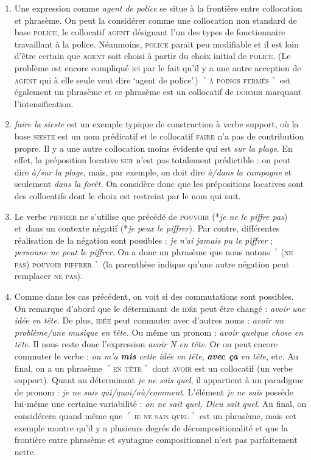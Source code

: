 {    
    \begin{enumerate}
    \item  Une expression comme \textit{agent de police} se situe à la frontière entre collocation et phrasème. On peut la considérer comme une collocation non standard de base \textsc{police}, le collocatif \textsc{agent} désignant l'un des types de fonctionnaire travaillant à la police. Néanmoins, \textsc{police} parait peu modifiable et il est loin d'être certain que \textsc{agent} soit choisi à partir du choix initial de \textsc{police}. (Le problème est encore compliqué ici par le fait qu’il y a une autre acception de \textsc{agent} qui à elle seule veut dire ‘agent de police’.) \textrm{$⌜$}\textsc{à} \textsc{poings} \textsc{fermés}\textrm{$⌝$} est également un phrasème et ce phrasème est un collocatif de \textsc{dormir} marquant l’intensification.
    \item  \textit{faire la sieste} est un exemple typique de construction à verbe support, où la base \textsc{sieste} est un nom prédicatif et le collocatif \textsc{faire} n’a pas de contribution propre. Il y a une autre collocation moins évidente qui est \textit{sur la plage}. En effet, la préposition locative \textsc{sur} n’est pas totalement prédictible : on peut dire \textit{à/sur la plage}, mais, par exemple, on doit dire \textit{à/dans la campagne} et seulement \textit{dans la forêt.} On considère donc que les prépositions locatives sont des collocatifs dont le choix est restreint par le nom qui suit.
    \item  Le verbe \textsc{piffrer} ne s’utilise que précédé de \textsc{pouvoir} (*\textit{je ne le piffre pas}) et~dans un contexte négatif (*\textit{je peux le piffrer}). Par contre, différentes réalisation de la négation sont possibles : \textit{je n’ai jamais pu le piffrer} ; \textit{personne ne peut le piffrer}. On a donc un phrasème que nous notons \textrm{$⌜$}\textsc{(ne} \textsc{pas)} \textsc{pouvoir} \textsc{piffrer}\textrm{$⌝$} (la parenthèse indique qu’une autre négation peut remplacer \textsc{ne} \textsc{pas}).
    \item  Comme dans les cas précédent, on voit si des commutations sont possibles. On remarque d’abord que le déterminant de \textsc{idée} peut être changé : \textit{avoir une idée en tête}. De plus, \textsc{idée} peut commuter avec d’autres noms : \textit{avoir un problème/une musique en tête.} Ou même un pronom : \textit{avoir quelque chose en tête}. Il nous reste donc l’expression \textit{avoir N en tête}. Or on peut encore commuter le verbe : \textit{on m’a \textbf{mis} cette idée en tête}, \textit{\textbf{avec ça} en tête}, etc. Au final, on a un phrasème \textrm{$⌜$}\textsc{en} \textsc{tête}\textrm{$⌝$} dont \textsc{avoir} est un collocatif (un verbe support). Quant au déterminant \textit{je ne sais quel}, il appartient à un paradigme de pronom : \textit{je ne sais qui/quoi/où/comment}. L’élément \textit{je ne sais} possède lui-même une certaine variabilité : \textit{on ne sait quel, Dieu sait quel}. Au final, on considérera quand même que \textrm{$⌜$}\textsc{je} \textsc{ne} \textsc{sais} \textsc{quel}\textrm{$⌝$} est un phrasème, mais cet exemple montre qu’il y a plusieurs degrés de décompositionalité et que la frontière entre phrasème et syntagme compositionnel n’est pas parfaitement nette.

\end{enumerate}}
